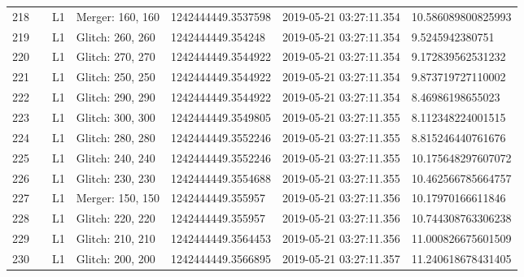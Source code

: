 \begin{longtable}{lllllll}
218  &                                                    &       L1 &  Merger: 160, 160 &  1242444449.3537598 &  2019-05-21 03:27:11.354 &  10.586089800825993 \\
219  &                                                    &       L1 &  Glitch: 260, 260 &   1242444449.354248 &  2019-05-21 03:27:11.354 &     9.5245942380751 \\
220  &                                                    &       L1 &  Glitch: 270, 270 &  1242444449.3544922 &  2019-05-21 03:27:11.354 &   9.172839562531232 \\
221  &                                                    &       L1 &  Glitch: 250, 250 &  1242444449.3544922 &  2019-05-21 03:27:11.354 &   9.873719727110002 \\
222  &                                                    &       L1 &  Glitch: 290, 290 &  1242444449.3544922 &  2019-05-21 03:27:11.354 &    8.46986198655023 \\
223  &                                                    &       L1 &  Glitch: 300, 300 &  1242444449.3549805 &  2019-05-21 03:27:11.355 &   8.112348224001515 \\
224  &                                                    &       L1 &  Glitch: 280, 280 &  1242444449.3552246 &  2019-05-21 03:27:11.355 &   8.815246440761676 \\
225  &                                                    &       L1 &  Glitch: 240, 240 &  1242444449.3552246 &  2019-05-21 03:27:11.355 &  10.175648297607072 \\
226  &                                                    &       L1 &  Glitch: 230, 230 &  1242444449.3554688 &  2019-05-21 03:27:11.355 &  10.462566785664757 \\
227  &                                                    &       L1 &  Merger: 150, 150 &   1242444449.355957 &  2019-05-21 03:27:11.356 &   10.17970166611846 \\
228  &                                                    &       L1 &  Glitch: 220, 220 &   1242444449.355957 &  2019-05-21 03:27:11.356 &  10.744308763306238 \\
229  &                                                    &       L1 &  Glitch: 210, 210 &  1242444449.3564453 &  2019-05-21 03:27:11.356 &  11.000826675601509 \\
230  &                                                    &       L1 &  Glitch: 200, 200 &  1242444449.3566895 &  2019-05-21 03:27:11.357 &  11.240618678431405 \\

\end{longtable}
